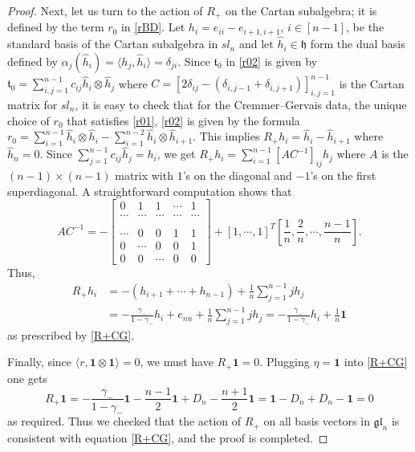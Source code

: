 \documentclass{amsart}
\theoremstyle{definition}
\theoremstyle{remark}
\numberwithin{equation}{section}
\numberwithin{theorem}{section}
\begin{document}
\begin{proof}
Next, let us turn to the action of $R_+$ on the Cartan subalgebra; it is defined by the term $r_0$ in \eqref{rBD}. 
Let $h_i=e_{ii} - e_{i+1,i+1}$, $i\in [n-1]$, be the standard basis of the Cartan subalgebra in $sl_n$ and 
let $\hat h_i\in {\mathfrak h}$ form the dual basis defined by $\alpha_j(\hat h_i)=\langle h_j, \hat h_i \rangle =\delta_{ji}$.
Since $\mathfrak t_0$ in \eqref{r02} is given by 
$\mathfrak t_0 = \sum_{i,j=1}^{n-1} c_{ij} \hat h_i\otimes \hat h_j$ where
$C=\left[2 \delta_{ij} - (\delta_{i,j-1}+\delta_{i,j+1})\right]_{i,j=1}^{n-1}$ is the Cartan matrix for 
$sl_{n}$,
it is easy to check that for the Cremmer--Gervais data, the unique choice of $r_0$ that satisfies \eqref{r01}, 
\eqref{r02} is given by the formula 
$r_0 = \sum_{i=1}^{n-1} \hat h_i \otimes \hat h_i - \sum_{i=1}^{n-2} \hat h_i \otimes \hat h_{i+1}$. 
This implies  $R_+h_i = \hat h_i - \hat h_{i+1}$ where $\hat h_n=0$.   
Since $\sum_{j=1}^{n-1} c_{ij}\hat h_j  = h_i$, we get
$R_+ h_i =\sum_{i=1}^{n-1} [A  C^{-1}]_{ij} h_j$ where $A$ is the $(n-1)\times( n-1)$ matrix with $1$'s on the diagonal and $-1$'s on the 
first superdiagonal.  A straightforward computation shows that
$$
A C^{-1}  = -\left [ \begin{array}{ccccc} 0 & 1 & 1 & \cdots & 1\\ \cdots & \cdots & \cdots & \cdots &\cdots \\
\\ \cdots & 0& 0 & 1 & 1 \\  0 & \cdots & 0 &0 &  1\\
0 & 0 & \cdots & 0 & 0 \end{array}
\right ] + [1, \cdots, 1]^T\left [ \frac 1 n, \frac 2n,\cdots, \frac{n-1} n \right ].
$$
Thus, 
\begin{equation*}
\begin{aligned}
R_+ h_i &=-( h_{i+1} + \cdots + h_{n-1}) + \frac 1 n \sum_{j=1}^{n-1} j h_{j} \\
&=- \frac{\gamma_-}{1-\gamma_-} h_i + e_{nn} + \frac 1 n \sum_{j=1}^{n-1} j h_{j}=
-\frac{\gamma_-}{1-\gamma_-} h_i + \frac 1 n {\mathbf 1}
\end{aligned}
\end{equation*}
as prescribed by \eqref{R+CG}.

Finally, since $\langle r, {\mathbf 1}\otimes {\mathbf 1} \rangle = 0$, we must have $R_+{\mathbf 1}=0$.
Plugging $\eta={\mathbf 1}$ into \eqref{R+CG} one gets
\[
R_+{\mathbf 1}=-\frac{\gamma_-}{1-\gamma_-} {\mathbf 1} -\frac{n-1} 2 {\mathbf 1} + D_n - \frac{n+1} 2 {\mathbf 1}=
{\mathbf 1} - D_n + D_n -{\mathbf 1}=0
\] 
as required. Thus we checked that the action of $R_+$ on all basis vectors in $\mathfrak{gl}_n$ is consistent 
with equation \eqref{R+CG}, and the proof is completed.
\end{proof}
       
\end{document}

